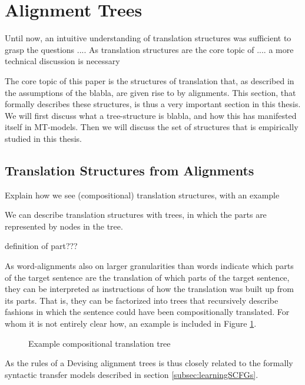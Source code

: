 \documentclass{report}
\theoremstyle{definition}
\theoremstyle{plain}
\begin{document}
\section{Alignment Trees}
\label{sec:alignmenttrees}

Until now, an intuitive understanding of translation structures was sufficient to grasp the questions .... As translation structures are the core topic of .... a more technical discussion is necessary

The core topic of this paper is the structures of translation that, as described in the assumptions of the blabla, are given rise to by alignments. This section, that formally describes these structures, is thus a very important section in this thesis. We will first discuss what a tree-structure is blabla, and how this has manifested itself in MT-models. Then we will discuss the set of structures that is empirically studied in this thesis.

\subsection{Translation Structures from Alignments}



Explain how we see (compositional) translation structures, with an example

We can describe translation structures with trees, in which the parts are represented by nodes in the tree.

definition of part???






As word-alignments also on larger granularities than words indicate which parts of the target sentence are the translation of which parts of the target sentence, they can be interpreted as instructions of how the translation was built up from its parts. That is, they can be factorized into trees that recursively describe fashions in which the sentence could have been compositionally translated. For whom it is not entirely clear how, an example is included in Figure \ref{fig:atree}.

\begin{figure}
\caption{Example compositional translation tree}\label{fig:atree}
\end{figure}

As the rules of a 
Devising alignment trees is thus closely related to the formally syntactic transfer models described in section \ref{subsec:learningSCFGs}.
\end{document}
